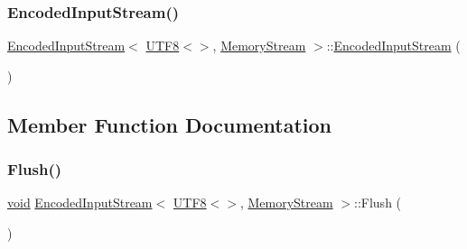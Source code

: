 \subsubsection{\texorpdfstring{Encoded\+Input\+Stream()}{EncodedInputStream()}\hspace{0.1cm}{\footnotesize\ttfamily [2/2]}}
{\footnotesize\ttfamily \hyperlink{classEncodedInputStream}{Encoded\+Input\+Stream}$<$ \hyperlink{structUTF8}{U\+T\+F8}$<$$>$, \hyperlink{structMemoryStream}{Memory\+Stream} $>$\+::\hyperlink{classEncodedInputStream}{Encoded\+Input\+Stream} (\begin{DoxyParamCaption}\item[{const \hyperlink{classEncodedInputStream}{Encoded\+Input\+Stream}$<$ \hyperlink{structUTF8}{U\+T\+F8}$<$$>$, \hyperlink{structMemoryStream}{Memory\+Stream} $>$ \&}]{ }\end{DoxyParamCaption})\hspace{0.3cm}{\ttfamily [private]}}



\subsection{Member Function Documentation}
\mbox{\label{classEncodedInputStream_3_01UTF8_3_4_00_01MemoryStream_01_4_ad911c889ebd4ded9bcf9d31ca124f9a7}} 
\subsubsection{\texorpdfstring{Flush()}{Flush()}}
{\footnotesize\ttfamily \hyperlink{imgui__impl__opengl3__loader_8h_ac668e7cffd9e2e9cfee428b9b2f34fa7}{void} \hyperlink{classEncodedInputStream}{Encoded\+Input\+Stream}$<$ \hyperlink{structUTF8}{U\+T\+F8}$<$$>$, \hyperlink{structMemoryStream}{Memory\+Stream} $>$\+::Flush (\begin{DoxyParamCaption}{ }\end{DoxyParamCaption})\hspace{0.3cm}{\ttfamily [inline]}}

\mbox{\label{classEncodedInputStream_3_01UTF8_3_4_00_01MemoryStream_01_4_a7c89eb320966f9a82027149eede0c8e9}} 
